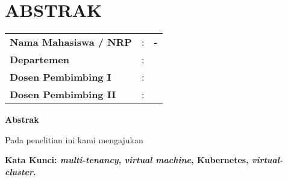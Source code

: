 \chapter*{ABSTRAK}


\vspace{2ex}

\begin{center}
  \large\textbf{\tatitle{}}
\end{center}

\vspace{2ex}

\begingroup
\setlength{\tabcolsep}{0pt}

\noindent
\begin{tabularx}{\textwidth}{l >{\centering}m{2em} X}
  \textbf{Nama Mahasiswa / NRP} & : & \textbf{\name{} - \nrp{}} \\
  \textbf{Departemen}           & : & \textbf{\department{}}    \\
  \textbf{Dosen Pembimbing I}   & : & \textbf{\advisor{}}       \\
  \textbf{Dosen Pembimbing II}  & : & \textbf{\coadvisor{}}     \\
\end{tabularx}
\endgroup

\noindent
\textbf{Abstrak}

Pada penelitian ini kami mengajukan \lipsum[1]

\vspace{2ex}
\noindent
\textbf{Kata Kunci: \emph{multi-tenancy}, \emph{virtual machine}, Kubernetes, \emph{virtual-cluster}.}
